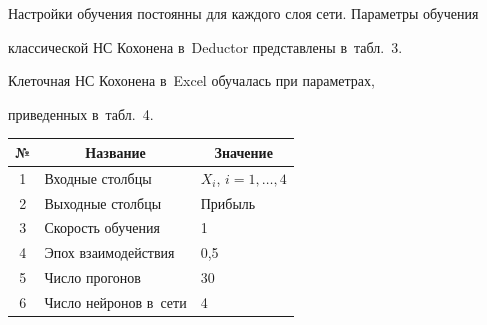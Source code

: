 \begin{description}











  Настройки обучения постоянны для каждого слоя сети. Параметры обучения 


классической НС Кохонена в~Deductor представлены в~табл.~3.


  











  


  Клеточная НС Кохонена в~Excel обучалась при параметрах, 


приведенных в~табл.~4.


  


\begin{table}\small %


\begin{center}




\vspace*{2ex}





\begin{tabular}{|c|l|l|}


\hline


№&\multicolumn{1}{c|}{Название}&\multicolumn{1}{c|}{Значение}\\


\hline


1&Входные столбцы&$X_i$, $i = 1, \ldots , 4$\\


2&Выходные столбцы&Прибыль\\


3&Скорость обучения&1\\


4&Эпох взаимодействия&0,5\\


5&Число прогонов&30\\


6&Число нейронов в~сети&4\\



\end{tabular}
\end{center}
\end{table}
\end{description}
